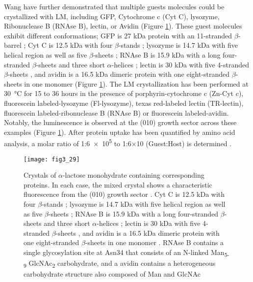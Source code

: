 \begin{refsection}
Wang  have further demonstrated that multiple guests molecules could be
crystallized with LM, including GFP, Cytochrome c (Cyt C), lysozyme,
Ribonuclease B (RNAse B), lectin, or Avidin \cite{Wang2001a} (Figure
\ref{fig:lm-other}). These guest molecules exhibit different conformations; GFP
is 27 kDa protein with an 11-stranded $\beta$-barrel \cite{Kurimoto1999};  Cyt C
is 12.5 kDa with four $\beta$-stands \cite{Hirota2010}; lysozyme is 14.7 kDa
with five helical region as well as five $\beta$-sheets \cite{Schwalbe2001};
RNAse B is 15.9 kDa with a long four-stranded $\beta$-sheets and three short
$\alpha$-helices \cite{Lamontagne2001}; lectin is 30 kDa with five 4-stranded
$\beta$-sheets \cite{Rini1995}, and avidin is a 16.5 kDa dimeric protein with
one eight-stranded $\beta$-sheets in one monomer \cite{Rosano1999} (Figure
\ref{fig:lm-other}). The LM crystallization has been performed at
\SI{30}{\celsius} for 15 to 36 hours in the presence of 
porphyrin-cytochrome c (Zn-Cyt c), fluorescein labeled-lysozyme (Fl-lysozyme),
texas red-labeled lectin (TR-lectin), fluorescein labeled-ribonuclease B (RNAse
B) or fluorescein labeled-avidin.  Notably, the luminescence is observed at the
(010) growth sector across these examples (Figure \ref{fig:lm-other}). After
protein uptake has been quantified by amino acid analysis, a molar ratio of
1:\num{6e5} to 1:6$\times$10 (Guest:Host) is determined \cite{Wang2001a}. 
\begin{figure}[htbp] \centering \texttt{[image: fig3\_29]}
    \caption[Crystals of $\alpha$-lactose monohydrate containing corresponding
    proteins. In each case, the mixed crystal shows a characteristic
    fluorescence from the (010) growth sector. GFP is a 27 kDa protein with
    11-stranded $\beta$-barrel;  Cyt C is a 12.5 kDa with 4 $\beta$-stands;
    lysozyme is a 14.7 kDa enzyme with a half-chair conformation; RNAse B is a
    15.9 kDa enzyme with a long 4-stranded $\beta$-sheets and 3 short
$\alpha$-helices. ]{Crystals of $\alpha$-lactose monohydrate containing
    corresponding proteins. In each case, the mixed crystal shows a
    characteristic fluorescence from the (010) growth sector \cite{Wang2001a}.
    Cyt C is 12.5 kDa with four $\beta$-stands \cite{Hirota2010}; lysozyme is
    14.7 kDa with five helical region as well as five $\beta$-sheets
    \cite{Schwalbe2001}; RNAse B is 15.9 kDa with a long four-stranded
    $\beta$-sheets and three short $\alpha$-helices \cite{Lamontagne2001};
    lectin is 30 kDa with five 4-stranded $\beta$-sheets \cite{Rini1995}, and
    avidin is a 16.5 kDa dimeric protein with one eight-stranded $\beta$-sheets
    in one monomer \cite{Rosano1999}. RNAse B contains a single glycosylation
    site at Asn34 that consists of an N-linked Man\textsubscript{5-9}
    GlcNAc\textsubscript{2} carbohydrate, and a avidin contains a heterogeneous
    carbohydrate structure also composed of Man and GlcNAc}
    \label{fig:lm-other}
\end{figure}


\end{refsection}
